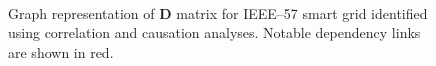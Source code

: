 \documentclass[12pt]{elsarticle}
\begin{document}
\begin{figure}[H]
\centering
{}
~
\caption{Graph representation of $\mathbf{D}$ matrix for IEEE--57 smart grid identified using correlation \protect{} and causation \protect{} analyses. Notable dependency links are shown in red.}
\label{fig:ieee57_graph}
\end{figure}
\end{document}
